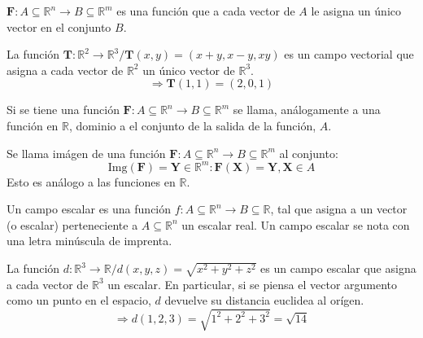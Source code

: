 \begin{definition}
    $\mathbf{F}:A\subseteq \mathbb{R}^n \rightarrow B \subseteq \mathbb{R}^m$
    es una función que a cada vector de $A$ le asigna un único vector en el conjunto $B$.
    \begin{example}
        La función $\boldsymbol{T}:\mathbb{R}^2 \rightarrow \mathbb{R}^3 / \boldsymbol{T}(x,y) = (x+y,x-y,xy)$
        es un campo vectorial que asigna a cada vector de $\mathbb{R}^2$ un único vector de $\mathbb{R}^3$.
        \begin{equation*}
            \Rightarrow \boldsymbol{T}(1,1)=(2,0,1)
        \end{equation*}
        \label{ej:campoVectorial}
    \end{example}
\end{definition}
\begin{definition}
    Si se tiene una función $\mathbf{F}:A\subseteq \mathbb{R}^n \rightarrow B \subseteq \mathbb{R}^m$
    se llama, análogamente a una función en $\mathbb{R}$, dominio a el conjunto de la salida de la función, $A$.
\end{definition}
\begin{definition}
    Se llama imágen de una función \newline$\mathbf{F}:A\subseteq \mathbb{R}^n \rightarrow B \subseteq \mathbb{R}^m$ al conjunto:
    \begin{equation*}
        \text{Img}(\mathbf{F})={\boldsymbol{Y}\in\mathbb{R}^m: \mathbf{F}(\boldsymbol{X})=\boldsymbol{Y}, \boldsymbol{X} \in A}
    \end{equation*}
    Esto es análogo a las funciones en $\mathbb{R}$.
\end{definition}
\begin{definition}
    Un campo escalar es una función $f:A\subseteq \mathbb{R}^n \rightarrow B \subseteq \mathbb{R}$, tal que asigna
    a un vector (o escalar) perteneciente a $A\subseteq \mathbb{R}^n$ un escalar real.
    Un campo escalar se nota con una letra minúscula de imprenta.
    \begin{example}
        La función $d:\mathbb{R}^3 \rightarrow \mathbb{R} / d(x,y,z) = \sqrt{x^2+y^2+z^2}$
        es un campo escalar que asigna a cada vector de $\mathbb{R}^3$ un escalar. 
        En particular, si se piensa el vector argumento como un punto en el espacio, $d$ devuelve su distancia euclidea al orígen.
        \begin{equation*}
            \Rightarrow d(1,2,3)=\sqrt{1^2+2^2+3^2}=\sqrt{14}
        \end{equation*}
        \label{ej:campoEscalar}
    \end{example}
\end{definition}
